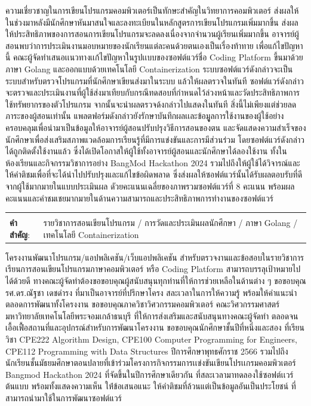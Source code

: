 \documentclass[12pt,one side,openright,a4paper]{cpe-thesis-th}
\begin{document}

\thaiabstract
\justifying
ความเชี่ยวชาญในการเขียนโปรแกรมคอมพิวเตอร์เป็นทักษะสำคัญในวิทยาการคอมพิวเตอร์ ส่งผลให้ในช่วงมาหลังมีนักศึกษาหันมาสนใจและลงทะเบียนในหลักสูตรการเขียนโปรแกรมเพิ่มมากขึ้น ส่งผลให้ประสิทธิภาพของการสอนการเขียนโปรแกรมจะลดลงเนื่องจากจำนวนผู้เรียนเพิ่มมากขึ้น อาจารย์ผู้สอนพบว่าการประเมินงานมอบหมายของนักเรียนแต่ละคนด้วยตนเองเป็นเรื่องท้าทาย เพื่อแก้ไขปัญหานี้ คณะผู้จัดทำเสนอเเนวทางเเก้ไขปัญหาในรูปเเบบของซอฟต์แวร์ชื่อ Coding Platform ขี้นมาด้วยภาษา Golang และออกแบบด้วยเทคโนโลยี Containerization ระบบซอฟต์แวร์ดังกล่าวจะเป็นระบบสำหรับตรวจโปรแกรมที่นักศึกษาเขียนส่งมาในระบบ แล้วให้ผลตรวจในทันที ซอฟต์แวร์ดังกล่าวจะตรวจและประเมินงานที่ผู้ใช้ส่งมาเทียบกับกรณีทดสอบที่กำหนดไว้ล่วงหน้าและวัดประสิทธิภาพการใช้ทรัพยากรของตัวโปรแกรม จากนั้นจะนำผลตรวจด้งกล่าวไปแสดงในทันที สิ่งนี้ไม่เพียงแต่ช่วยลดภาระของผู้สอนเท่านั้น แพลตฟอร์มดังกล่าวยังรักษาบันทึกผลเเละข้อมููลการใช้งานของผู้ใช้อย่างครอบคลุมเพื่อนำมาเป็นข้อมูลให้อาจารย์ผู้สอนปรับปรุงวิธีการสอนของตน และจัดแสดงความสำเร็จของนักศึกษาเพื่อส่งเสริมสภาพแวดล้อมการเรียนรู้ที่มีการแข่งขันและการมีส่วนร่วม โดยซอฟต์แวร์ดังกล่าวได้ถูกติดตั้งใช้งานแล้ว ซึ่งได้เปิดโอกาสให้ผู้ใช้ทั้งอาจารย์ผู้สอนและนักศึกษาได้ลองใช้งาน ทั้งในห้องเรียนและกิจกรรมวิชาการอย่าง BangMod Hackathon 2024 รวมไปถึงให้ผู้ใช้ได้วิจารณ์และให้คำติชมเพื่อที่จะได้นำไปปรับปรุงและแก้ไขข้อผิดพลาด ซึ่งส่งผลให้ซอฟต์แวร์นั้นได้รับผลตอบรับที่ดีจากผู้ใช้มากมายในแบบประเมินผล ดัวยคะแนนเฉลี่ยของภาพรวมซอฟต์แวร์ที่ 8 คะแนน พร้อมผลคะแนนและคำชมเชยมากมายในด้านความสามารถและประสิทธิภาพการทำงานของซอฟต์แวร์

\justifying
\begin{tabular*}{\textwidth}{@{}lp{}}
  & \\
  \textbf{คำสำคัญ}: & รายวิชาการสอนเขียนโปรแกรม / การวัดและประเมินผลนักศึกษา / ภาษา Golang / เทคโนโลยี Containerization
\end{tabular*}
\vspace{1mm}
\endabstract

\preface
โครงงานพัฒนาโปรแกรม/แอปพลิเคชัน/เว็บแอปพลิเคชัน สำหรับตรวจงานและข้อสอบในรายวิชาการเรียนการสอนเขียนโปรแกรมภาษาคอมพิวเตอร์ หรือ Coding Platform สามารถบรรลุเป้าหมายไปได้ด้วยดี ทางคณะผู้จัดทำต้องขอขอบคุณผู้สนับสนุนทุกท่านที่ให้การช่วยเหลือในด้านต่าง ๆ ขอขอบคุณ รศ.ดร.ณัฐชา เดชดำรง ที่มาเป็นอาจารย์ที่ปรึกษาโครง สละเวลาในการให้ความรู้ พร้อมให้คำแนะนำตลอดการพัฒนาทั้งโครงงาน ขอขอบคุณภาควิชาวิศวกรรมคอมพิวเตอร์ คณะวิศวกรรมศาสตร์ มหาวิทยาลัยเทคโนโลยีพระจอมเกล้าธนบุรี ที่ให้การส่งเสริมและสนับสนุนทางคณะผู้จัดทำ ตลอดจนเอื้อเฟื้อสถานที่และอุปกรณ์สำหรับการพัฒนาโครงงาน ขอขอบคุณนักศึกษาชั้นปีที่หนึ่งและสอง ที่เรียนวิชา CPE222 Algorithm Design, CPE100 Computer Programming for Engineers, CPE112 Programming with Data Structures ปีการศึกษาพุทธศักราช 2566 รวมไปถึงนักเรียนชั้นมัธยมศึกษาตอนปลายที่เข้าร่วมโครงการกิจกรรมการเเข่งขันเขียนโปรเเกรมคอมพิวเตอร์ Bangmod Hackathon 2024 ที่จัดขึ้นในปีการศึกษาเดียวกัน ที่สละเวลามาทดลองใช้ซอฟต์เเวร์ต้นแบบ พร้อมทั้งแสดงความเห็น ให้่ข้อเสนอแนะ ให้คำติชมที่ล้วนแต่เป็นข้อมูลอันเป็นประโยชน์ ที่สามารถนำมาใช้ในการพัฒนาซอฟต์แวร์
\end{document}
